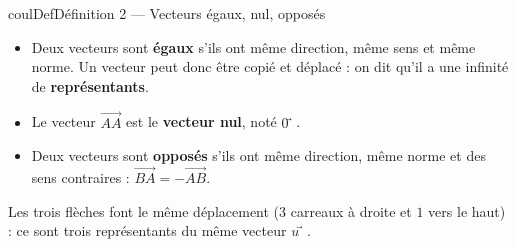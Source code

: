 \documentclass[11pt,a4paper]{article}
\makeatletter
\newcommand{\vect}[1]{\overrightarrow{#1}}
\newcommand{\quadrillage}[4]{\draw[grille,step=1] (#1,#2) grid (#3,#4);}
\newcounter{lycee@signet}
\newcommand{\signet}[3][]{\stepcounter{lycee@signet}%
  \edef\lycee@dest{\if\relax\detokenize{#1}\relax
    signet.\arabic{lycee@signet}\else#1\fi}%
  \hypertarget{\lycee@dest}{}\bookmark[level=#2,dest=\lycee@dest]{#3}}
\def\vec#1{#1⃗}}%
\newenvironment{definitionbox}[1][Définition]%
  {\begin{boitecours}[phantom={\signet{2}{#1}}]{coulDef}{#1}}{\end{boitecours}}
\makeatother
\begin{document}
\begin{definitionbox}[Définition 2 --- Vecteurs égaux, nul, opposés]
\begin{itemize}
  \item Deux vecteurs sont \textbf{égaux} s'ils ont même direction, même sens et même
        norme. Un vecteur peut donc être copié et déplacé : on dit qu'il a une infinité
        de \textbf{représentants}.
  \item Le vecteur $\vect{AA}$ est le \textbf{vecteur nul}, noté $\vec{0}$.
  \item Deux vecteurs sont \textbf{opposés} s'ils ont même direction, même norme et
        des sens contraires : $\vect{BA}=-\vect{AB}$.
\end{itemize}
\end{definitionbox}

\begin{exemplebox}
\begin{center}
\end{center}
Les trois flèches font le même déplacement ($3$ carreaux à droite et $1$ vers le haut) :
ce sont trois représentants du même vecteur $\vec{u}$.
\end{exemplebox}
\end{document}
